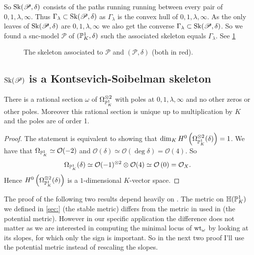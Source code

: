 So $\operatorname{Sk}(\mathscr P, \delta)$ consists of the paths running running between every pair of $0, 1, \lambda, \infty$. Thus $\Gamma_\lambda \subset \operatorname{Sk}(\mathscr P, \delta)$ as $\Gamma_\lambda$ is the convex hull of $0, 1, \lambda, \infty$.
As  the only leaves of $\operatorname{Sk}(\mathscr P, \delta)$ are $0, 1, \lambda, \infty$ we also get the converse $\Gamma_\lambda \subset  \operatorname{Sk}(\mathscr P, \delta)$. 
So we found a snc-model $\mathscr P$ of $(\mathbb{P}^{1}_K, \delta)$ such the associated skeleton equals $\Gamma_\lambda$. 
See \cref{fig:skeleton_of_the_pair}

\begin{figure}[ht]
    \centering
    \caption{The skeleton associated to $\mathscr P$ and $(\mathscr P, \delta)$ (both in red).}
    \label{fig:skeleton_of_the_pair}
\end{figure}

\subsection{$\operatorname{Sk}(\mathscr P)$ is a Kontsevich-Soibelman skeleton} \label{sec:sk_P_is_a_kontsevich-soibelman_skeleton}

\begin{lemma}\label{lem:unique_form_pair}
	There is a rational section $\omega$ of $\Omega_{\mathbb{P}^{1}_K}^{\otimes 2}$ with poles at  $0, 1, \lambda, \infty$ and no other zeros or other poles. 
	Moreover this rational section is unique up to multiplication by $K$ and the poles are of order 1. 
\end{lemma}
\begin{proof}
	The statement is equivalent to showing that $\dim_K H^{0}\left(\Omega_{\mathbb{P}^{1}_K}^{\otimes 2}(\delta)\right)  = 1$.
	We have that $\Omega_{\mathbb{P}^{1}_K} \simeq \mathcal{O}(-2)$ and $\mathcal{O}(\delta) \simeq \mathcal{O}(\deg \delta) = \mathcal{O}(4)$.
	So \[
		\Omega_{\mathbb{P}^{1}_K} (\delta) \simeq \mathcal{O}(-1)^{\otimes 2} \otimes \mathcal{O}(4) \simeq \mathcal{O}\left(0 \right)  = \mathcal{O}_X
	.\] 
	Hence $H^{0}\left(\Omega_{\mathbb{P}^{1}_K}^{\otimes 2}(\delta)\right)$ is a $1$-dimensional $K$-vector space. 
\end{proof}

The proof of the following two results depend heavily on \cite[thm.\ 3.2.3]{bakerWeightFunctionsBerkovich2016}. 
	The metric on $\mathbb{H}(\mathbb{P}^{1}_K)$ we defined in \cref{sec:} (the stable metric) differs from the metric in used in \cite{bakerWeightFunctionsBerkovich2016} (the potential metric). 
	However in our specific application the difference does not matter as we are interested in computing the minimal locus of $\operatorname{wt}_\omega$ by looking at its slopes, for which only the sign is important.
	So in the next two proof I'll use the potential metric instead of rescaling the slopes.

